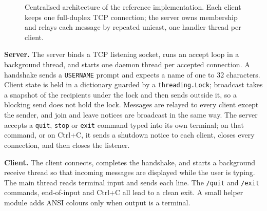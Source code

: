 \documentclass[conference]{IEEEtran}
\newcommand{\code}[1]{\texttt{#1}}
\begin{document}
\begin{figure}[t]
\centering
{}
\caption{Centralised architecture of the reference implementation. Each client keeps one full-duplex TCP connection; the server owns membership and relays each message by repeated unicast, one handler thread per client.}
\label{fig:arch}
\end{figure}

\textbf{Server.} The server binds a TCP listening socket, runs an accept loop in a background thread, and starts one daemon thread per accepted connection. A handshake sends a \code{USERNAME} prompt and expects a name of one to 32 characters. Client state is held in a dictionary guarded by a \code{threading.Lock}; broadcast takes a snapshot of the recipients under the lock and then sends outside it, so a blocking send does not hold the lock. Messages are relayed to every client except the sender, and join and leave notices are broadcast in the same way. The server accepts a \code{quit}, \code{stop} or \code{exit} command typed into its own terminal; on that command, or on Ctrl+C, it sends a shutdown notice to each client, closes every connection, and then closes the listener.

\textbf{Client.} The client connects, completes the handshake, and starts a background receive thread so that incoming messages are displayed while the user is typing. The main thread reads terminal input and sends each line. The \code{/quit} and \code{/exit} commands, end-of-input and Ctrl+C all lead to a clean exit. A small helper module adds ANSI colours only when output is a terminal.
\end{document}
